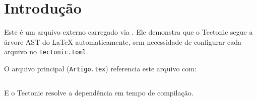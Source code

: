 \section{Introdução}

Este é um arquivo externo carregado via \verb||.
Ele demonstra que o Tectonic segue a árvore AST do LaTeX automaticamente,
sem necessidade de configurar cada arquivo no \texttt{Tectonic.toml}.

O arquivo principal (\texttt{Artigo.tex}) referencia este arquivo com:
\begin{verbatim}

\end{verbatim}

E o Tectonic resolve a dependência em tempo de compilação.

